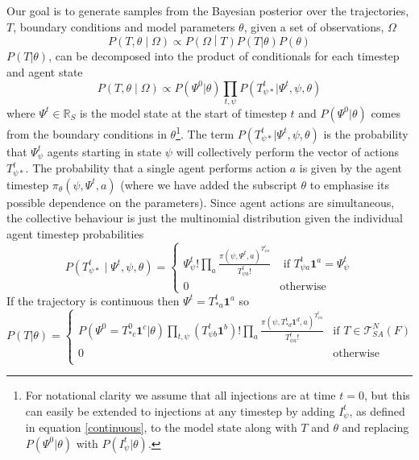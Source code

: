 \documentclass{article}
\begin{document}
Our goal is to generate samples from the Bayesian posterior over the trajectories, $T$, boundary conditions and model parameters $\theta$, given a set of observations, $\Omega$
\[
P\left(T,\theta \middle| \Omega\right) \propto P\left(\Omega \middle| T\right)P(T|\theta)P(\theta)
\]
$P(T|\theta)$, can be decomposed into the product of conditionals for each timestep and agent state
\[
P\left(T,\theta \middle| \Omega\right) \propto  P(\Psi^0|\theta) \prod_{t,\psi} P(T^t_{\psi *} | \Psi^t,\psi,\theta)
\]
where $\Psi^t\in\mathbb{R}_S$ is the model state at the start of timestep $t$ and $P(\Psi^0|\theta)$ comes from the boundary conditions in $\theta$\footnote{For notational clarity we assume that all injections are at time $t=0$, but this can easily be extended to injections at any timestep by adding $I^t_\psi$, as defined in equation \eqref{continuous}, to the model state along with $T$ and $\theta$ and replacing $P(\Psi^0|\theta)$ with $P(I^t_\psi|\theta)$.}.  The term $P(T^t_{\psi *} | \Psi^t,\psi,\theta)$ is the probability that $\Psi^t_\psi$ agents starting in state $\psi$ will collectively perform the vector of actions $T^t_{\psi *}$. The probability that a single agent performs action $a$ is given by the agent timestep $\pi_\theta(\psi,\Psi^t,a)$ (where we have added the subscript $\theta$ to emphasise its possible dependence on the parameters). Since agent actions are simultaneous, the collective behaviour is just the multinomial distribution given the individual agent timestep probabilities
\begin{equation}
P\left(T^t_{\psi *} \mid \Psi^t, \psi, \theta\right) = 
\begin{cases}
\Psi^t_\psi!\prod_a \frac{\pi(\psi,\Psi^t,a)^{T^t_{\psi a}}}{T^t_{\psi a}!} & \text{ if } T^t_{\psi a}\mathbf{1}^a = \Psi^t_\psi \\
0 & \text{otherwise}
\end{cases}
\end{equation}
If the trajectory is continuous then $\Psi^t = T^t_{* a}\mathbf{1}^a$ so 
\begin{equation}
P(T|\theta) =
\begin{cases}
P(\Psi^0 = T^0_{* c}\mathbf{1}^c|\theta)
\prod_{t, \psi} \left(T^t_{\psi b} \mathbf{1}^b \right)!
\prod_{a} \frac{\pi(\psi, T^{t}_{* d}\mathbf{1}^d,a)^{T^{t}_{\psi a}}}{T^{t}_{\psi a}!} & \text{if } T \in \mathcal{T}^N_{SA}(F) \\
0 & \text{otherwise}\\
\end{cases}
\label{priorTrajectory}
\end{equation}
\end{document}

